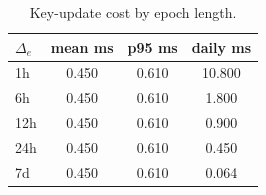 \begin{table}[htbp]
\centering
\caption{Key-update cost by epoch length.}
\label{tab:key-update}
\begin{tabular}{@{}lccc@{}}
\toprule
$\Delta_e$ & mean ms & p95 ms & daily ms \\
\midrule
1h & 0.450 & 0.610 & 10.800 \\
6h & 0.450 & 0.610 & 1.800 \\
12h & 0.450 & 0.610 & 0.900 \\
24h & 0.450 & 0.610 & 0.450 \\
7d & 0.450 & 0.610 & 0.064 \\
\bottomrule
\end{tabular}
\end{table}
